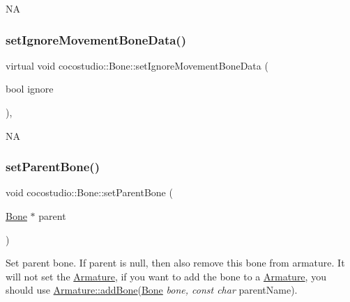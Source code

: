 NA \mbox{\label{classcocostudio_1_1Bone_a6c8735332243b0b39df0bc437eb0b733}} 
\subsubsection{\texorpdfstring{set\+Ignore\+Movement\+Bone\+Data()}{setIgnoreMovementBoneData()}\hspace{0.1cm}{\footnotesize\ttfamily [2/2]}}
{\footnotesize\ttfamily virtual void cocostudio\+::\+Bone\+::set\+Ignore\+Movement\+Bone\+Data (\begin{DoxyParamCaption}\item[{bool}]{ignore }\end{DoxyParamCaption})\hspace{0.3cm}{\ttfamily [inline]}, {\ttfamily [virtual]}}

NA \mbox{\label{classcocostudio_1_1Bone_ac68dd00133f611910e2ceb5bc19a1618}} 
\subsubsection{\texorpdfstring{set\+Parent\+Bone()}{setParentBone()}\hspace{0.1cm}{\footnotesize\ttfamily [1/2]}}
{\footnotesize\ttfamily void cocostudio\+::\+Bone\+::set\+Parent\+Bone (\begin{DoxyParamCaption}\item[{\hyperlink{classcocostudio_1_1Bone}{Bone} $\ast$}]{parent }\end{DoxyParamCaption})}

Set parent bone. If parent is null, then also remove this bone from armature. It will not set the \hyperlink{classcocostudio_1_1Armature}{Armature}, if you want to add the bone to a \hyperlink{classcocostudio_1_1Armature}{Armature}, you should use \hyperlink{classcocostudio_1_1Armature_af7a204c1c43c67de2c29c9d3dff58c55}{Armature\+::add\+Bone}(\hyperlink{classcocostudio_1_1Bone}{Bone} {\itshape bone, const char} parent\+Name).


